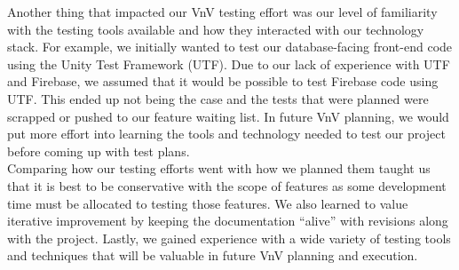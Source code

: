 \documentclass[12pt, titlepage]{article}
\begin{document}
Another thing that impacted our VnV testing effort was our level of familiarity with the testing tools available and how they interacted with our technology stack.
For example, we initially wanted to test our database-facing front-end code using the Unity Test Framework (UTF). Due to our lack of experience with UTF and Firebase, we assumed that
it would be possible to test Firebase code using UTF. This ended up not being the case and the tests that were planned were scrapped or pushed to our feature waiting list. In future VnV planning, we would
put more effort into learning the tools and technology needed to test our project before coming up with test plans.\\

Comparing how our testing efforts went with how we planned them taught us that it is best to be conservative with the scope of features as some development time must
be allocated to testing those features. We also learned to value iterative improvement by keeping the documentation ``alive'' with revisions along with the project.
Lastly, we gained experience with a wide variety of testing tools and techniques that will be valuable in future VnV planning and execution.
\end{document}
